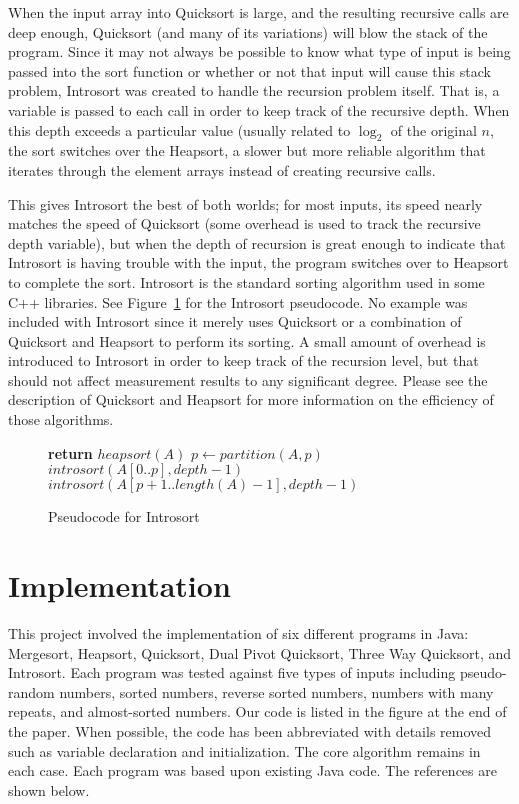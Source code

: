 \documentclass{article}
\begin{document}
When the input array into Quicksort is large, and the resulting recursive calls are deep enough,
Quicksort (and many of its variations) will blow the stack of the program. Since it may not always
be possible to know what type of input is being passed into the sort function or whether or
not that input will cause this stack problem, Introsort was created to handle the recursion problem
itself.
That is, a variable is passed to each call in order to keep track of the recursive depth. When
this depth exceeds a particular value (usually related to $\log_2$ of the original $n$, the sort 
switches over the Heapsort, a slower but more reliable algorithm that iterates
through the element arrays instead of creating recursive calls.

This gives Introsort the best of both worlds; for most inputs, its speed nearly matches the
speed of Quicksort (some overhead is used to track the recursive depth variable), but when
the depth of recursion is great enough to indicate that Introsort is having trouble with the
input, the program switches over to Heapsort to complete the sort. Introsort is the standard
sorting algorithm used in some C++ libraries. See Figure~\ref{pseudo-introsort} for the 
Introsort pseudocode. No example was included with Introsort since it
merely uses Quicksort or a combination of Quicksort and Heapsort to
perform its sorting. A small amount of overhead is introduced to Introsort
in order to keep track of the recursion level, but that should not affect
measurement results to any significant degree. Please see the description of
Quicksort and Heapsort for more information on the efficiency of those
algorithms.

\begin{figure}
\begin{algorithmic}
			\State \textbf{return}
		\EndIf
			\State $heapsort(A)$
		\Else
			\State $p \gets partition(A,p)$
			\State $introsort(A[0..p], depth - 1)$
			\State $introsort(A[p+1..length(A) - 1], depth - 1)$
		\EndIf
	\EndProcedure
\end{algorithmic}
\caption{Pseudocode for Introsort}
\label{pseudo-introsort}
\end{figure}

\section{Implementation}
This project involved the implementation of six different programs in Java: Mergesort,
Heapsort, Quicksort, Dual Pivot Quicksort, Three Way Quicksort, and Introsort. Each
program was tested against five types of inputs including pseudo-random numbers,
sorted numbers, reverse sorted numbers, numbers with many repeats, and almost-sorted
numbers. Our code is listed in the figure at the end of the paper. When possible, the code has
been abbreviated with details removed such as variable declaration and initialization. The
core algorithm remains in each case. Each program was based upon existing Java code.
The references are shown below.
\end{document}
